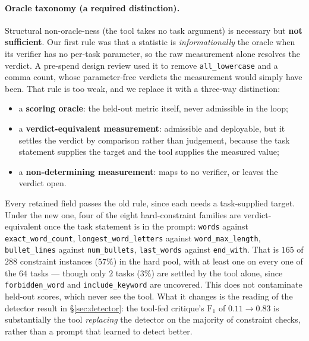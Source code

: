\documentclass[11pt]{article}
\begin{document}
\paragraph{Oracle taxonomy (a required distinction).}
Structural non-oracle-ness (the tool takes no task argument) is necessary but
\textbf{not sufficient}. Our first rule was that a statistic is \emph{informationally} the
oracle when its verifier has no per-task parameter, so the raw measurement alone resolves the
verdict. A pre-spend design review used it to remove \texttt{all\_lowercase} and a comma count,
whose parameter-free verdicts the measurement would simply have been. That rule is too weak,
and we replace it with a three-way distinction:
\begin{itemize}\itemsep0pt
\item a \textbf{scoring oracle}: the held-out metric itself, never admissible in the loop;
\item a \textbf{verdict-equivalent measurement}: admissible and deployable, but it settles the
verdict by comparison rather than judgement, because the task statement supplies the target
and the tool supplies the measured value;
\item a \textbf{non-determining measurement}: maps to no verifier, or leaves the verdict open.
\end{itemize}
Every retained field passes the old rule, since each needs a task-supplied target. Under the
new one, four of the eight hard-constraint families are verdict-equivalent once the task
statement is in the prompt: \texttt{words} against \texttt{exact\_word\_count},
\texttt{longest\_word\_letters} against \texttt{word\_max\_length}, \texttt{bullet\_lines}
against \texttt{num\_bullets}, \texttt{last\_words} against \texttt{end\_with}. That is $165$
of $288$ constraint instances ($57\%$) in the hard pool, with at least one on every one of the
$64$ tasks --- though only $2$ tasks ($3\%$) are settled by the tool alone, since
\texttt{forbidden\_word} and \texttt{include\_keyword} are uncovered. This does not contaminate
held-out scores, which never see the tool. What it changes is the reading of the detector
result in \S\ref{sec:detector}: the tool-fed critique's $\mathrm{F}_1$ of $0.11 \to 0.83$ is
substantially the tool \emph{replacing} the detector on the majority of constraint checks,
rather than a prompt that learned to detect better.
\end{document}
